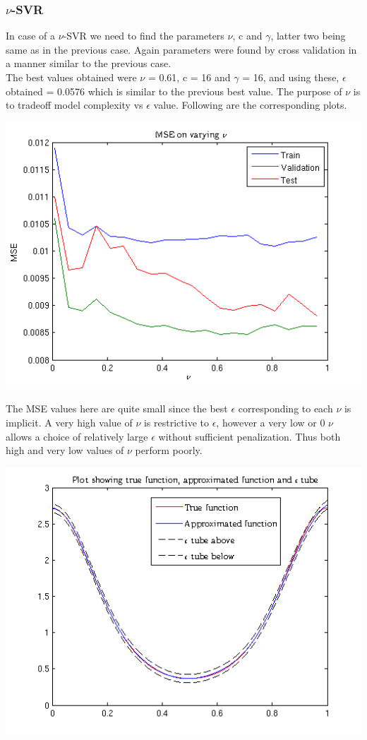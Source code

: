 \documentclass{article}
\begin{document}
\newpage
\subsubsection{$\nu$-SVR}
In case of a $\nu$-SVR we need to find the parameters $\nu$, c and $\gamma$, latter two being same as in the previous case. Again parameters were found by cross validation in a manner similar to the previous case. \\[5pt]
The best values obtained were $\nu$ = 0.61, c = 16 and $\gamma$ = 16, and using these, $\epsilon$ obtained = 0.0576 which is similar to the previous best value. The purpose of $\nu$ is to tradeoff model complexity vs $\epsilon$ value. Following are the corresponding plots.
\begin{center}
\includegraphics[scale=.7]{Regression/nu/mse}
\end{center}
The MSE values here are quite small since the best $\epsilon$ corresponding to each $\nu$ is implicit. A very high value of $\nu$ is restrictive to $\epsilon$, however a very low or 0 $\nu$ allows a choice of relatively large $\epsilon$ without sufficient penalization. Thus both high and very low values of $\nu$ perform poorly.
\begin{center}
\includegraphics[scale=.7]{Regression/nu/Plot_1}
\end{center}
\end{document}
